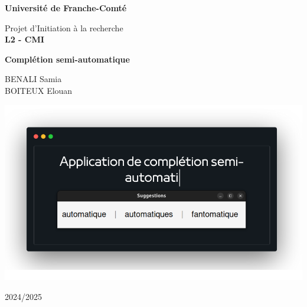 \documentclass[a4paper, 11pt]{report}
\begin{document}
\begin{titlepage}
	\centering
	{\Huge \textbf{Université de Franche-Comté} \par}
	\vspace{1cm}
	{\huge \texttt{}{Projet d'Initiation à la recherche\\ } \LARGE{\textbf{L2 - CMI}} \par}
	\vspace{1cm}
	{\huge \textbf{Complétion semi-automatique} \par}
	\vspace{1cm}
	{\Large BENALI Samia\\ BOITEUX Elouan\par}
	\vspace{0.5cm}
	\begin{center}
		{\includegraphics[height=0.55\textwidth]{images/illustration.png}}
	\end{center}

	\begin{minipage}[c]{0.40\textwidth}
		\centering
	\end{minipage}
	\hfill
	\begin{minipage}[c]{0.5\textwidth}
		\centering
	\end{minipage}
	\vfill
	{2024/2025}
\end{titlepage}
\end{document}

